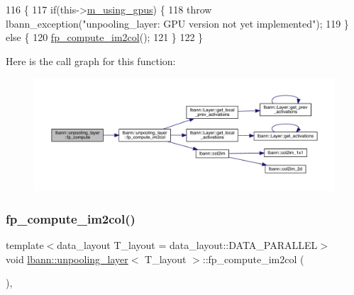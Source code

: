 \begin{DoxyCode}
116                              \{
117     \textcolor{keywordflow}{if}(this->\hyperlink{classlbann_1_1Layer_af7881cb5eff5207c15fa835d65462e8f}{m\_using\_gpus}) \{
118       \textcolor{keywordflow}{throw} lbann\_exception(\textcolor{stringliteral}{"unpooling\_layer: GPU version not yet implemented"});
119     \} \textcolor{keywordflow}{else} \{
120       \hyperlink{classlbann_1_1unpooling__layer_ab4a0b7cc4711426434983c41cd7dbc63}{fp\_compute\_im2col}();
121     \}
122   \}
\end{DoxyCode}
Here is the call graph for this function\+:\nopagebreak
\begin{figure}[H]
\begin{center}
\leavevmode
\includegraphics[width=350pt]{classlbann_1_1unpooling__layer_aad98d442d6f5ad1feb5f1d71bdb1df49_cgraph}
\end{center}
\end{figure}
\mbox{\label{classlbann_1_1unpooling__layer_ab4a0b7cc4711426434983c41cd7dbc63}} 
\subsubsection{\texorpdfstring{fp\+\_\+compute\+\_\+im2col()}{fp\_compute\_im2col()}}
{\footnotesize\ttfamily template$<$data\+\_\+layout T\+\_\+layout = data\+\_\+layout\+::\+D\+A\+T\+A\+\_\+\+P\+A\+R\+A\+L\+L\+EL$>$ \\
void \hyperlink{classlbann_1_1unpooling__layer}{lbann\+::unpooling\+\_\+layer}$<$ T\+\_\+layout $>$\+::fp\+\_\+compute\+\_\+im2col (\begin{DoxyParamCaption}{ }\end{DoxyParamCaption})\hspace{0.3cm}{\ttfamily [inline]}, {\ttfamily [private]}}



